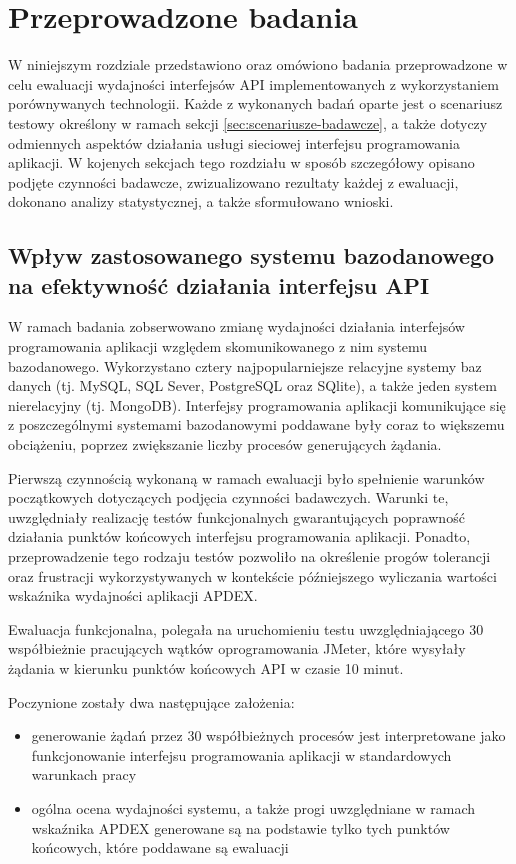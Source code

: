 \chapter{Przeprowadzone badania}
W niniejszym rozdziale przedstawiono oraz omówiono badania przeprowadzone w celu ewaluacji wydajności interfejsów API implementowanych z wykorzystaniem porównywanych technologii. Każde z wykonanych badań oparte jest o scenariusz testowy określony w ramach sekcji \ref{sec:scenariusze-badawcze}, a także dotyczy odmiennych aspektów działania usługi sieciowej interfejsu programowania aplikacji. W kojenych sekcjach tego rozdziału w sposób szczegółowy opisano podjęte czynności badawcze, zwizualizowano rezultaty każdej z ewaluacji, dokonano analizy statystycznej, a także sformułowano wnioski.

\section{Wpływ zastosowanego systemu bazodanowego na efektywność działania interfejsu API}
\label{research:crud}
W ramach badania zobserwowano zmianę wydajności działania interfejsów programowania aplikacji względem skomunikowanego z nim systemu bazodanowego. Wykorzystano cztery najpopularniejsze relacyjne systemy baz danych (tj. MySQL, SQL Sever, PostgreSQL oraz SQlite), a także jeden system nierelacyjny (tj. MongoDB). Interfejsy programowania aplikacji komunikujące się z poszczególnymi systemami bazodanowymi poddawane były coraz to większemu obciążeniu, poprzez zwiększanie liczby procesów generujących żądania.

Pierwszą czynnością wykonaną w ramach ewaluacji było spełnienie warunków początkowych dotyczących podjęcia czynności badawczych. Warunki te, uwzględniały realizację testów funkcjonalnych gwarantujących poprawność działania punktów końcowych interfejsu programowania aplikacji. Ponadto, przeprowadzenie tego rodzaju testów pozwoliło na określenie progów tolerancji oraz frustracji wykorzystywanych w kontekście późniejszego wyliczania wartości wskaźnika wydajności aplikacji APDEX.

Ewaluacja funkcjonalna, polegała na uruchomieniu testu uwzględniającego 30 współbieżnie pracujących wątków oprogramowania JMeter, które wysyłały żądania w kierunku punktów końcowych API w czasie 10 minut.

Poczynione zostały dwa następujące założenia:
\begin{itemize}
    \item generowanie żądań przez 30 współbieżnych procesów jest interpretowane jako funkcjonowanie interfejsu programowania aplikacji w standardowych warunkach pracy
    \item ogólna ocena wydajności systemu, a także progi uwzględniane w ramach wskaźnika APDEX generowane są na podstawie tylko tych punktów końcowych, które poddawane są ewaluacji
\end{itemize}

